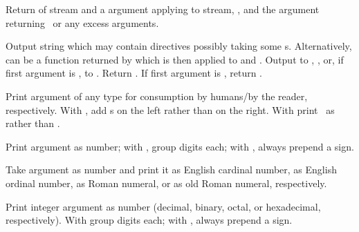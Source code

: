 \begin{LIST}{1cm}

  {
  Return  of stream and a  argument applying  to
  stream, , and the  argument
  returning \NIL\ or any excess arguments. 
  }

  {
  Output string  which may
  contain \kwd{\TLD} directives possibly taking some
  s. Alternatively,  can be a function returned
  by  which is then applied to  and .
  Output to , , or, if first
  argument is \T, to . Return \retval{\NIL}. If
  first argument is \NIL, return . 
  }

  \begin{LIST}{.5cm}

    {
    Print argument of any type for consumption by humans/by the
    reader, respectively. With , add s on the left
    rather than on the right. With \kwd{:} print \NIL\ as \LIT{()} rather
    than .
  }

    {
    Print argument as number; with \KWD{:}, group digits 
     each; with , always prepend a sign.
  }

    {
    Take argument as number and print it as English cardinal number,
    as English ordinal number, as Roman numeral, or as old Roman
    numeral, respectively.
  }

    {
    Print integer argument as number (decimal, binary, octal, or
    hexadecimal, respectively). With \kwd{:} group digits 
     each; with , always prepend a sign.
  }


\end{LIST}
\end{LIST}
